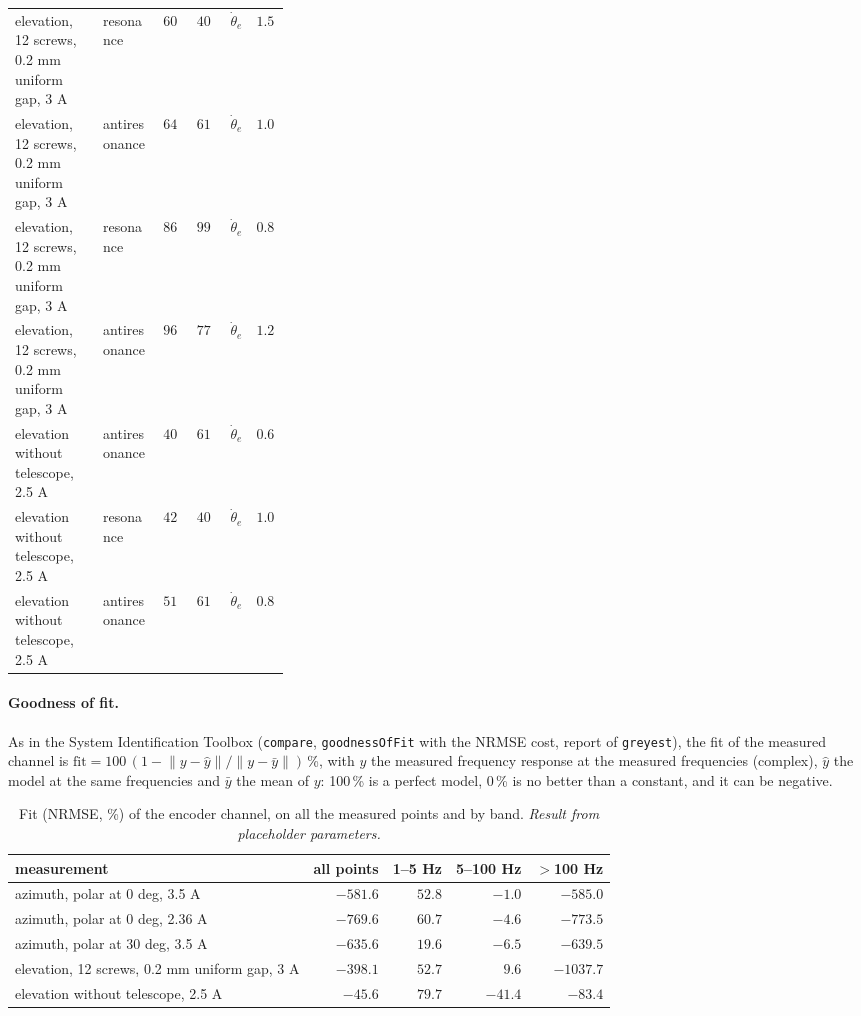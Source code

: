 \documentclass[10pt,a4paper]{article}
\numberwithin{equation}{section}
\begin{document}
\begin{longtable}{p{0.32\linewidth}lrrlr}
elevation, 12 screws, 0.2 mm uniform gap, 3 A & resonance & $607.6$ & $403.2$ & $\dot\theta_e$ & $1.51$ \\
elevation, 12 screws, 0.2 mm uniform gap, 3 A & antiresonance & $644.1$ & $617.4$ & $\dot\theta_e$ & $1.04$ \\
elevation, 12 screws, 0.2 mm uniform gap, 3 A & resonance & $861.9$ & $999.3$ & $\dot\theta_e$ & $0.863$ \\
elevation, 12 screws, 0.2 mm uniform gap, 3 A & antiresonance & $968.5$ & $774$ & $\dot\theta_e$ & $1.25$ \\
elevation without telescope, 2.5 A & antiresonance & $404.1$ & $617.4$ & $\dot\theta_e$ & $0.655$ \\
elevation without telescope, 2.5 A & resonance & $428.4$ & $400.1$ & $\dot\theta_e$ & $1.07$ \\
elevation without telescope, 2.5 A & antiresonance & $510.2$ & $617.4$ & $\dot\theta_e$ & $0.826$ \\
\bottomrule\end{longtable}
\paragraph{Goodness of fit.} As in the System Identification Toolbox (\texttt{compare}, \texttt{goodnessOfFit} with the NRMSE cost, report of \texttt{greyest}), the fit of the measured channel is $\mathrm{fit} = 100\,(1 - \lVert y - \hat y\rVert/\lVert y - \bar y\rVert)$\,\%, with $y$ the measured frequency response at the measured frequencies (complex), $\hat y$ the model at the same frequencies and $\bar y$ the mean of $y$: 100\,\% is a perfect model, 0\,\% is no better than a constant, and it can be negative.
\begin{table}[H]\centering\small
\caption{Fit (NRMSE, \%) of the encoder channel, on all the measured points and by band. \emph{Result from placeholder parameters.}}\label{tab:exp_fit}
\begin{tabular}{lrrrr}\toprule
measurement & all points & 1--5 Hz & 5--100 Hz & $>$100 Hz \\ \midrule
azimuth, polar at 0 deg, 3.5 A & $-581.6$ & $52.8$ & $-1.0$ & $-585.0$ \\
azimuth, polar at 0 deg, 2.36 A & $-769.6$ & $60.7$ & $-4.6$ & $-773.5$ \\
azimuth, polar at 30 deg, 3.5 A & $-635.6$ & $19.6$ & $-6.5$ & $-639.5$ \\
elevation, 12 screws, 0.2 mm uniform gap, 3 A & $-398.1$ & $52.7$ & $9.6$ & $-1037.7$ \\
elevation without telescope, 2.5 A & $-45.6$ & $79.7$ & $-41.4$ & $-83.4$ \\
\bottomrule\end{tabular}\end{table}
\end{document}

